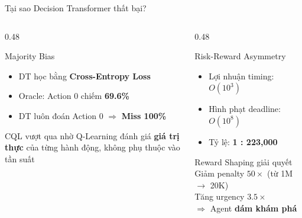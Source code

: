 \documentclass[aspectratio=169, 12pt, xcolor=table]{beamer}
\begin{document}
\begin{frame}{Tại sao Decision Transformer thất bại?}
  \begin{columns}[T]
    \begin{column}{0.48\textwidth}
      \begin{alertblock}{Majority Bias}
        \begin{itemize}
          \item DT học bằng \textbf{Cross-Entropy Loss}
          \item Oracle: Action 0 chiếm \textbf{69.6\%}
          \item DT luôn đoán Action 0 $\Rightarrow$ \textbf{Miss 100\%}
        \end{itemize}
      \end{alertblock}
      \vspace{0.5em}
      \begin{block}{CQL vượt qua nhờ}
        Q-Learning đánh giá \textbf{giá trị thực} của từng hành động, không phụ thuộc vào tần suất
      \end{block}
    \end{column}
    \begin{column}{0.48\textwidth}
      \begin{alertblock}{Risk-Reward Asymmetry}
        \begin{itemize}
          \item Lợi nhuận timing: $O(10^3)$
          \item Hình phạt deadline: $O(10^8)$
          \item Tỷ lệ: \textbf{1 : 223,000}
        \end{itemize}
      \end{alertblock}
      \vspace{0.5em}
      \begin{block}{Reward Shaping giải quyết}
        Giảm penalty $50\times$ (từ 1M $\to$ 20K)\\
        Tăng urgency $3.5\times$\\
        $\Rightarrow$ Agent \textbf{dám khám phá}
      \end{block}
    \end{column}
  \end{columns}
\end{frame}
\end{document}
